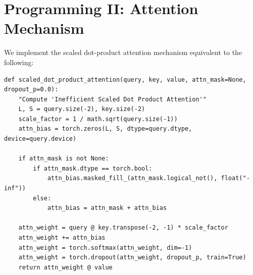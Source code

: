 \documentclass[11pt, a4paper, oneside]{memoir}
\begin{document}
\chapter{Programming II: Attention Mechanism}
We implement the scaled dot-product attention mechanism equivalent to the following:
\begin{verbatim}
def scaled_dot_product_attention(query, key, value, attn_mask=None, dropout_p=0.0):
    "Compute 'Inefficient Scaled Dot Product Attention'"
    L, S = query.size(-2), key.size(-2)
    scale_factor = 1 / math.sqrt(query.size(-1))
    attn_bias = torch.zeros(L, S, dtype=query.dtype, device=query.device)

    if attn_mask is not None:
        if attn_mask.dtype == torch.bool:
            attn_bias.masked_fill_(attn_mask.logical_not(), float("-inf"))
        else:
            attn_bias = attn_mask + attn_bias

    attn_weight = query @ key.transpose(-2, -1) * scale_factor
    attn_weight += attn_bias
    attn_weight = torch.softmax(attn_weight, dim=-1)
    attn_weight = torch.dropout(attn_weight, dropout_p, train=True)
    return attn_weight @ value
\end{verbatim}
\label{LastPage}
\end{document}
